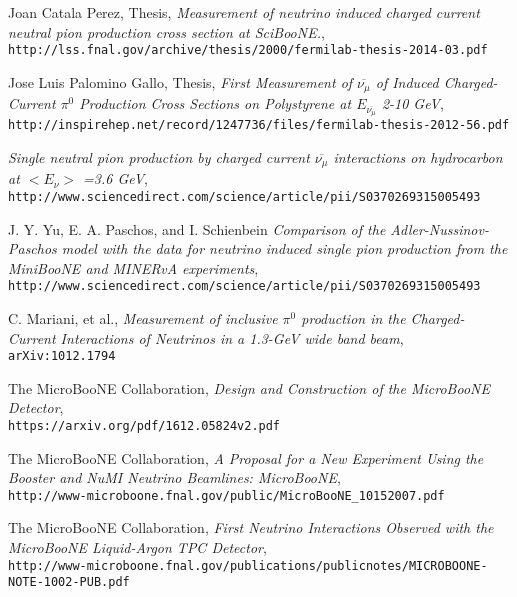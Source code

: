 \documentclass[12pt]{article}
\begin{document}
\begin{thebibliography}{20}
  Joan Catala Perez, Thesis, \emph{Measurement of neutrino induced charged current neutral pion production cross section at SciBooNE.},\\
  \texttt{http://lss.fnal.gov/archive/thesis/2000/fermilab-thesis-2014-03.pdf}  

  Jose Luis Palomino Gallo, Thesis, \emph{First Measurement of $\overline{\nu_\mu}$ of Induced Charged-Current $\pi^0$ Production Cross Sections on Polystyrene at $E_{\overline{\nu_\mu}}$ 2-10 GeV},\\
  \texttt{http://inspirehep.net/record/1247736/files/fermilab-thesis-2012-56.pdf}  
  
   \emph{Single neutral pion production by charged current $\overline{\nu_\mu}$ interactions on hydrocarbon at $< E_\nu >$ =3.6 GeV},\\
  \texttt{http://www.sciencedirect.com/science/article/pii/S0370269315005493}  

  J. Y. Yu, E. A. Paschos, and I. Schienbein \emph{Comparison of the Adler-Nussinov-Paschos model with the data for neutrino induced single pion production from the MiniBooNE and MINERvA experiments},\\
  \texttt{http://www.sciencedirect.com/science/article/pii/S0370269315005493}  
  
  C. Mariani, et al., \emph{Measurement of inclusive $\pi^0$ production in the Charged-Current Interactions of Neutrinos in a 1.3-GeV wide band beam},\\
  \texttt{arXiv:1012.1794}

  The MicroBooNE Collaboration, \emph{Design and Construction of the MicroBooNE Detector},\\
  \texttt{https://arxiv.org/pdf/1612.05824v2.pdf}

  The MicroBooNE Collaboration, \emph{A Proposal for a New Experiment Using the Booster and NuMI Neutrino Beamlines: MicroBooNE},\\
  \texttt{http://www-microboone.fnal.gov/public/MicroBooNE\_10152007.pdf}

  The MicroBooNE Collaboration, \emph{First Neutrino Interactions Observed with the MicroBooNE Liquid-Argon TPC Detector},\\
  \texttt{http://www-microboone.fnal.gov/publications/publicnotes/MICROBOONE-NOTE-1002-PUB.pdf}


\end{thebibliography}
\end{document}
